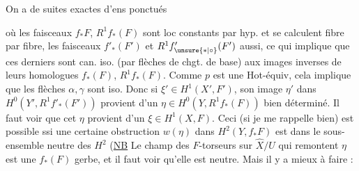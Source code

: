 

On a  de suites exactes d'ens
ponctués

où les faisceaux $f_*F$, $R^1 f_*(F)$ sont loc constants
par hyp. et se calculent fibre par fibre, les
faisceaux $f'_*(F')$ et $R^1 f'_{\unsure{*|\circ}}(F')$ aussi, ce qui implique
que ces derniers sont can. iso. (par  flèches de
chgt. de base) aux images inverses de leurs
homologues $f_*(F)$, $R^1 f_*(F)$. Comme $p$ est
une Hot-équiv, cela implique que les flèches
$\alpha,\gamma$ sont iso. Donc si $\xi'\in H^1(X',F')$, son image $\eta'$
dans $H^0(Y',R^1 f'_*(F'))$ provient d'un $\eta\in H^0(Y,R^1 f_*(F))$
bien déterminé. Il faut voir que cet $\eta$ provient
d'un $\xi\in H^1(X,F)$. Ceci (si je me rappelle bien)
est possible ssi une certaine obstruction $w(\eta)$
dans $H^2(Y,f_*F)$ est dans le sous-ensemble neutre des
$H^2$ (\uline{NB}  Le champ  des $F$-torseurs sur  $\widehat X/U$
qui remontent $\eta$ est une  $f_*(F)$ gerbe,  et il faut
voir qu'elle est neutre. Mais il y a mieux à faire :

